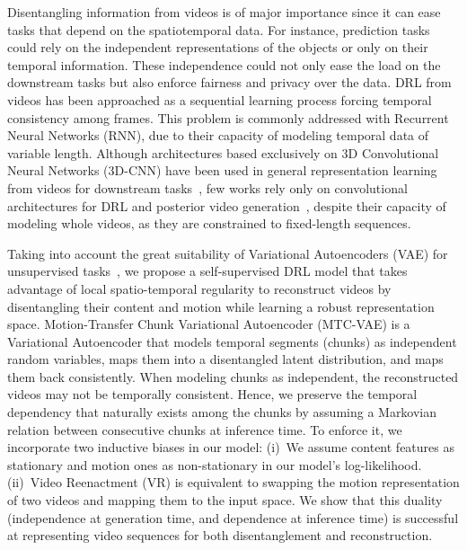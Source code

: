 \documentclass[journal]{IEEEtran}
\begin{document}
Disentangling information from videos is of major importance since it can ease tasks that depend on the spatiotemporal data.
For instance, prediction tasks could rely on the independent representations of the objects or only on their temporal information.
These independence could not only ease the load on the downstream tasks but also enforce fairness and privacy over the data.
DRL from videos has been approached as a sequential learning process forcing temporal consistency among frames.
This problem is commonly addressed with Recurrent Neural Networks (RNN), due to their capacity of modeling temporal data of variable length.
Although architectures based exclusively on 3D Convolutional Neural Networks (3D-CNN) have been used in general representation learning from videos for downstream tasks~\cite{Carreira2017, Feichtenhofer2019}, few works rely only on convolutional architectures for DRL and posterior video generation~\cite{Wang2020, Aich2020}, despite their capacity of modeling whole videos, as they are constrained to fixed-length sequences.

Taking into account the great suitability of Variational Autoencoders (VAE) for unsupervised tasks~\cite{Su2020,Shi2018},
we propose a self-supervised DRL model that takes advantage of local spatio-temporal regularity to reconstruct videos by disentangling their content and motion while learning a robust representation space.
Motion-Transfer Chunk Variational Autoencoder (MTC-VAE) is a Variational Autoencoder that models temporal segments (\aka chunks) as independent random variables, maps them into a disentangled latent distribution, and maps them back consistently.
When modeling chunks as independent, the reconstructed videos may not be temporally consistent.
Hence, we preserve the temporal dependency that naturally exists among the chunks by assuming a Markovian relation between consecutive chunks at inference time.
To enforce it, we incorporate two inductive biases in our model:
(i)~We assume content features as stationary and motion ones as non-stationary in our model's log-likelihood.
(ii)~Video Reenactment (VR) is equivalent to swapping the motion representation of two videos and mapping them to the input space.
We show that this duality (independence at generation time, and dependence at inference time) is successful at representing video sequences for both disentanglement and reconstruction.
\end{document}

